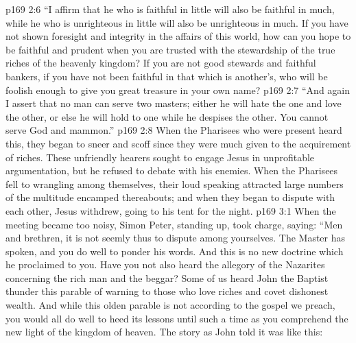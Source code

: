 \vs p169 2:6 \textcolor{ubdarkred}{“I affirm that he who is faithful in little will also be faithful in much, while he who is unrighteous in little will also be unrighteous in much. If you have not shown foresight and integrity in the affairs of this world, how can you hope to be faithful and prudent when you are trusted with the stewardship of the true riches of the heavenly kingdom? If you are not good stewards and faithful bankers, if you have not been faithful in that which is another’s, who will be foolish enough to give you great treasure in your own name?}
\vs p169 2:7 \textcolor{ubdarkred}{“And again I assert that no man can serve two masters; either he will hate the one and love the other, or else he will hold to one while he despises the other. You cannot serve God and mammon.”}
\vs p169 2:8 \pc When the Pharisees who were present heard this, they began to sneer and scoff since they were much given to the acquirement of riches. These unfriendly hearers sought to engage Jesus in unprofitable argumentation, but he refused to debate with his enemies. When the Pharisees fell to wrangling among themselves, their loud speaking attracted large numbers of the multitude encamped thereabouts; and when they began to dispute with each other, Jesus withdrew, going to his tent for the night.
\vs p169 3:1 When the meeting became too noisy, Simon Peter, standing up, took charge, saying: “Men and brethren, it is not seemly thus to dispute among yourselves. The Master has spoken, and you do well to ponder his words. And this is no new doctrine which he proclaimed to you. Have you not also heard the allegory of the Nazarites concerning the rich man and the beggar? Some of us heard John the Baptist thunder this parable of warning to those who love riches and covet dishonest wealth. And while this olden parable is not according to the gospel we preach, you would all do well to heed its lessons until such a time as you comprehend the new light of the kingdom of heaven. The story as John told it was like this:
